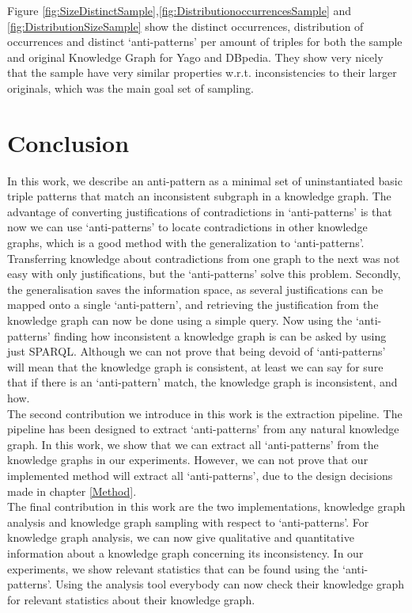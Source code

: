 \documentclass[11pt,letterpaper ,oneside ]{book}
\begin{document}
	
	
	Figure \ref{fig:SizeDistinctSample},\ref{fig:DistributionoccurrencesSample} and \ref{fig:DistributionSizeSample} show the distinct occurrences, distribution of occurrences and distinct `anti-patterns' per amount of triples for both the sample and original Knowledge Graph for Yago and DBpedia. They show very nicely that the sample have very similar properties w.r.t. inconsistencies to their larger originals, which was the main goal set of sampling. 
	

	\newpage
	
	\chapter{Conclusion}\label{Conclusion}
	In this work, we describe an anti-pattern as a minimal set of uninstantiated basic triple patterns that match an inconsistent subgraph in a knowledge graph. The advantage of converting justifications of contradictions in `anti-patterns' is that now we can use `anti-patterns' to locate contradictions in other knowledge graphs, which is a good method with the generalization to `anti-patterns'. Transferring knowledge about contradictions from one graph to the next was not easy with only justifications, but the `anti-patterns' solve this problem. 
	Secondly, the generalisation saves the information space, as several justifications can be mapped onto a single `anti-pattern', and retrieving the justification from the knowledge graph can now be done using a simple query. Now using the `anti-patterns' finding how inconsistent a knowledge graph is can be asked by using just SPARQL. Although we can not prove that being devoid of `anti-patterns' will mean that the knowledge graph is consistent, at least we can say for sure that if there is an `anti-pattern' match, the knowledge graph is inconsistent, and how.  \\
	
	The second contribution we introduce in this work is the extraction pipeline. The pipeline has been designed to extract `anti-patterns' from any natural knowledge graph. In this work, we show that we can extract all `anti-patterns' from the knowledge graphs in our experiments. However, we can not prove that our implemented method will extract all `anti-patterns', due to the design decisions made in chapter \ref{Method}.\\ 
	
	The final contribution in this work are the two implementations, knowledge graph analysis and knowledge graph sampling with respect to `anti-patterns'. For knowledge graph analysis, we can now give qualitative and quantitative information about a knowledge graph concerning its inconsistency. In our experiments, we show relevant statistics that can be found using the `anti-patterns'. Using the analysis tool everybody can now check their knowledge graph for relevant statistics about their knowledge graph. \\
	
\end{document}
